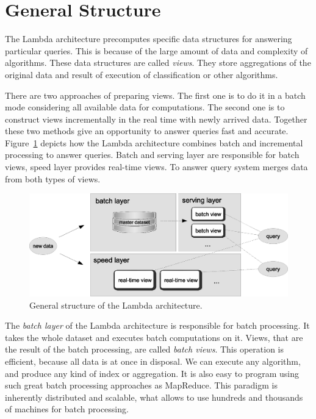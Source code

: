 \section{General Structure}

The Lambda architecture precomputes specific data structures for answering particular queries.
This is because of the large amount of data and complexity of algorithms.
These data structures are called \textit{views}.
They store aggregations of the original data and result of execution of classification or other algorithms.

There are two approaches of preparing views.
The first one is to do it in a batch mode considering all available data for computations.
The second one is to construct views incrementally in the real time with newly arrived data.
Together these two methods give an opportunity to answer queries fast and accurate.
Figure~\ref{fig:lambda_architecture} depicts how the Lambda architecture combines batch and incremental processing to answer queries.
Batch and serving layer are responsible for batch views, speed layer provides real-time views.
To answer query system merges data from both types of views.

\begin{figure}[h]
  \centering
  \includegraphics [width=1.0\textwidth]{images/LambdaArchitecture}
  \caption{General structure of the Lambda architecture.}
  \label{fig:lambda_architecture}
\end{figure}

The \textit{batch layer}  of the Lambda architecture is responsible for batch processing.
It takes the whole dataset and executes batch computations on it.
Views, that are the result of the batch processing, are called \textit{batch views}.
This operation is efficient, because all data is at once in disposal.
We can execute any algorithm, and produce any kind of index or aggregation.
It is also easy to program using such great batch processing approaches as MapReduce.
This paradigm is inherently distributed and scalable, what allows to use hundreds and thousands of machines for batch processing.

